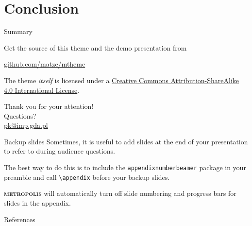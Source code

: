 \documentclass[10pt,aspectratio=169]{beamer} %
\newcommand{\themename}{\textbf{\textsc{metropolis}}\xspace}
\begin{document}
\section{Conclusion}
\begin{frame}{Summary}

  Get the source of this theme and the demo presentation from

  \begin{center}\url{github.com/matze/mtheme}\end{center}

  The theme \emph{itself} is licensed under a
  \href{http://creativecommons.org/licenses/by-sa/4.0/}{Creative Commons
  Attribution-ShareAlike 4.0 International License}.

  \begin{center}\ccbysa\end{center}

\end{frame}
{
\begin{frame}[standout]
  Thank you for your attention!\\ \vspace{12pt}
  Questions?\\ \vspace{12pt}
  \url{pk@imp.gda.pl}
\end{frame}
}
\appendix
\begin{frame}[fragile]{Backup slides}
  Sometimes, it is useful to add slides at the end of your presentation to
  refer to during audience questions.

  The best way to do this is to include the \verb|appendixnumberbeamer|
  package in your preamble and call \verb|\appendix| before your backup slides.

  \themename will automatically turn off slide numbering and progress bars for
  slides in the appendix.
\end{frame}
\begin{frame}[t,allowframebreaks]{References} %

  
  

\end{frame}
\end{document}
